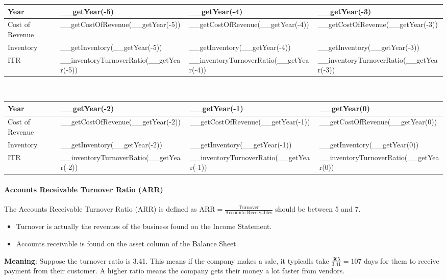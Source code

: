 \begin{tabularx}{\textwidth}{|X|X|X|X|}
 \hline
 Year                     & __getYear(-5)                           & __getYear(-4)                           & __getYear(-3)                           \\
 \hline
 Cost of Revenue          & __getCostOfRevenue(__getYear(-5))       & __getCostOfRevenue(__getYear(-4))       & __getCostOfRevenue(__getYear(-3))       \\
 Inventory                & __getInventory(__getYear(-5))           & __getInventory(__getYear(-4))           & __getInventory(__getYear(-3))           \\
 \rowcolor{lightgray} ITR & __inventoryTurnoverRatio(__getYear(-5)) & __inventoryTurnoverRatio(__getYear(-4)) & __inventoryTurnoverRatio(__getYear(-3)) \\
 \hline
\end{tabularx}\\

\begin{tabularx}{\textwidth}{|X|X|X|X|}
 \hline
 Year                     & __getYear(-2)                           & __getYear(-1)                           & __getYear(0)                           \\
 \hline
 Cost of Revenue          & __getCostOfRevenue(__getYear(-2))       & __getCostOfRevenue(__getYear(-1))       & __getCostOfRevenue(__getYear(0))       \\
 Inventory                & __getInventory(__getYear(-2))           & __getInventory(__getYear(-1))           & __getInventory(__getYear(0))           \\
 \rowcolor{lightgray} ITR & __inventoryTurnoverRatio(__getYear(-2)) & __inventoryTurnoverRatio(__getYear(-1)) & __inventoryTurnoverRatio(__getYear(0)) \\
 \hline
\end{tabularx}

\paragraph{Accounts Receivable Turnover Ratio (ARR)}

The Accounts Receivable Turnover Ratio (ARR) is defined as
$\text{ARR} = \frac{\text{Turnover}}{\text{Accounts Receivables}}$ should be
between 5 and 7.
\begin{itemize}
    \item Turnover is actually the revenues of the business found on the Income Statement.
    \item Accounts receivable is found on the asset column of the Balance Sheet.
\end{itemize}
\textbf{Meaning}: Suppose the turnover ratio is 3.41. This means if the company
makes a sale, it typicalls take $\frac{\text{365}}{3.41} = 107$ days for them to
receive payment from their customer. A higher ratio means the company gets their
money a lot faster from vendors.\\

